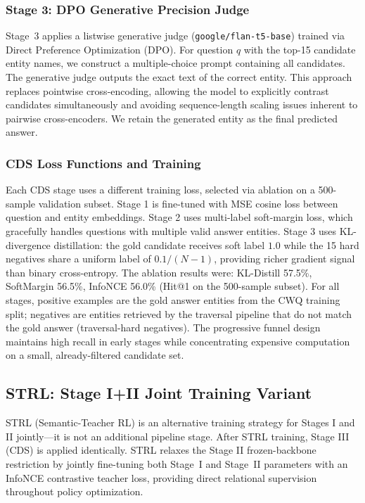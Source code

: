 \documentclass[10pt,conference]{IEEEtran}
\begin{document}
\subsubsection{Stage 3: DPO Generative Precision Judge}

Stage~3 applies a listwise generative judge (\texttt{google/flan-t5-base}) trained via Direct Preference Optimization (DPO). For question $q$ with the top-15 candidate entity names, we construct a multiple-choice prompt containing all candidates. The generative judge outputs the exact text of the correct entity. This approach replaces pointwise cross-encoding, allowing the model to explicitly contrast candidates simultaneously and avoiding sequence-length scaling issues inherent to pairwise cross-encoders. We retain the generated entity as the final predicted answer.

\subsubsection{CDS Loss Functions and Training}

Each CDS stage uses a different training loss, selected via ablation on a 500-sample validation subset. Stage 1 is fine-tuned with MSE cosine loss between question and entity embeddings. Stage 2 uses multi-label soft-margin loss, which gracefully handles questions with multiple valid answer entities. Stage 3 uses KL-divergence distillation: the gold candidate receives soft label $1.0$ while the 15 hard negatives share a uniform label of $0.1/(N{-}1)$, providing richer gradient signal than binary cross-entropy. The ablation results were: KL-Distill 57.5\%, SoftMargin 56.5\%, InfoNCE 56.0\% (Hit@1 on the 500-sample subset). For all stages, positive examples are the gold answer entities from the CWQ training split; negatives are entities retrieved by the traversal pipeline that do not match the gold answer (traversal-hard negatives). The progressive funnel design maintains high recall in early stages while concentrating expensive computation on a small, already-filtered candidate set.

\subsection{STRL: Stage I+II Joint Training Variant}

STRL (Semantic-Teacher RL) is an alternative training strategy for Stages I and II jointly---it is not an additional pipeline stage. After STRL training, Stage III (CDS) is applied identically. STRL relaxes the Stage II frozen-backbone restriction by jointly fine-tuning both Stage~I and Stage~II parameters with an InfoNCE contrastive teacher loss, providing direct relational supervision throughout policy optimization.
\end{document}
